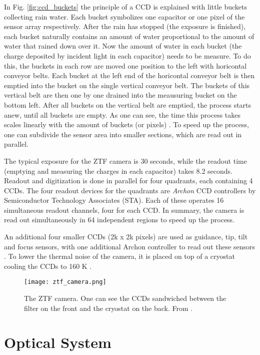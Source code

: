 In Fig. \ref{fig:ccd_buckets} the principle of a CCD is explained with little buckets collecting rain water. Each bucket symbolizes one capacitor or one pixel of the sensor array respectively. After the rain has stopped (the exposure is finished), each bucket naturally contains an amount of water proportional to the amount of water that rained down over it. Now the amount of water in each bucket (the charge deposited by incident light in each capacitor) needs to be measure. To do this, the buckets in each row are moved one position to the left with horicontal conveyor belts. Each bucket at the left end of the horicontal conveyor belt is then emptied into the bucket on the single vertical conveyor belt. The buckets of this vertical belt are then one by one drained into the meausuring bucket on the bottom left. After all buckets on the vertical belt are emptied, the process starts anew, until all buckets are empty. As one can see, the time this process takes scales linearly with the amount of buckets (or pixels) . To speed up the process, one can subdivide the sensor area into smaller sections, which are read out in parallel.



The typical exposure for the ZTF camera is 30 seconds, while the readout time (emptying and measuring the charges in each capacitor) takes 8.2 seconds. Readout and digitization is done in parallel for four quadrants, each containing 4 CCDs. The four readout devices for the quadrants are \textit{Archon} CCD controllers by Semiconductor Technology Associates (STA). Each of these operates 16 simultaneous readout channels, four for each CCD. In summary, the camera is read out simultaneously in 64 independent regions to speed up the process.

An additional four smaller CCDs (2k x 2k pixels) are used as guidance, tip, tilt and focus sensors, with one additional Archon controller to read out these sensors . To lower the thermal noise of the camera, it is placed on top of a cryostat cooling the CCDs to 160 K \cite{Dekany2016}.

\begin{figure}[]
    \texttt{[image: ztf\_camera.png]}
    \caption[The ZTF Camera]{The ZTF camera. One can see the CCDs sandwiched between the filter on the front and the cryostat on the back. From \cite{Bellm2019}.}
\end{figure}

\section{Optical System}

